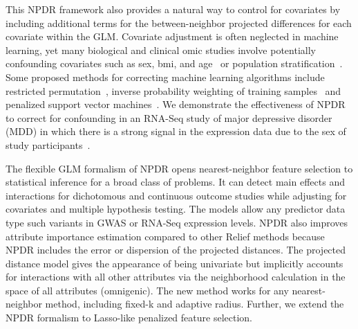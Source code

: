 \documentclass{bioinfo}
\begin{document}
This NPDR framework also provides a natural way to control for covariates by including additional terms for the between-neighbor projected differences for each covariate within the GLM.
Covariate adjustment is often neglected in machine learning, yet many biological and clinical omic studies involve potentially confounding covariates such as sex, bmi, and age~\citep{le18_brainagesim} or population stratification~\citep{popstrat16}.
Some proposed methods for correcting machine learning algorithms include restricted permutation~\citep{rao2017}, inverse probability weighting of training samples~\citep{linn2016} and penalized support vector machines~\citep{li2011ccsvm}.
We demonstrate the effectiveness of NPDR to correct for confounding in an RNA-Seq study of major depressive disorder (MDD) in which there is a strong signal in the expression data due to the sex of study participants~\citep{mostafavi14}.

The flexible GLM formalism of NPDR opens nearest-neighbor feature selection to statistical inference for a broad class of problems.
It can detect main effects and interactions for dichotomous and continuous outcome studies while adjusting for covariates and multiple hypothesis testing.
The models allow any predictor data type such variants in GWAS or RNA-Seq expression levels.
NPDR also improves attribute importance estimation compared to other Relief methods because NPDR includes the error or dispersion of the projected distances.
The projected distance model gives the appearance of being univariate but implicitly accounts for interactions with all other attributes via the neighborhood calculation in the space of all attributes (omnigenic). The new method works for any nearest-neighbor method, including fixed-k and adaptive radius. 
Further, we extend the NPDR formalism to Lasso-like penalized feature selection.
\end{document}
